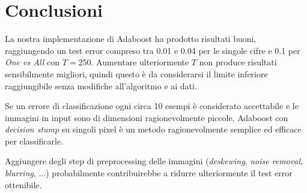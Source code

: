 \section{Conclusioni}

La nostra implementazione di Adaboost ha prodotto risultati buoni, raggiungendo un test error compreso tra 0.01 e 0.04 per le singole cifre e 0.1 per {\it One vs All} con \(T = 250\). Aumentare ulteriormente $T$ non produce risultati sensibilmente migliori, quindi questo \`e da considerarsi il limite inferiore raggiungibile senza modifiche all'algoritmo e ai dati.

Se un errore di classificazione ogni circa 10 esempi \`e considerato accettabile e le immagini in input sono di dimensioni ragionevolmente piccole, Adaboost con {\it decision stump} su singoli pixel \`e un metodo ragionevolmente semplice ed efficace per classificarle.

Aggiungere degli step di preprocessing delle immagini ({\it deskewing}, {\it noise removal}, {\it blurring}, $\dotsc$) probabilmente contribuirebbe a ridurre ulteriormente il test error ottenibile.